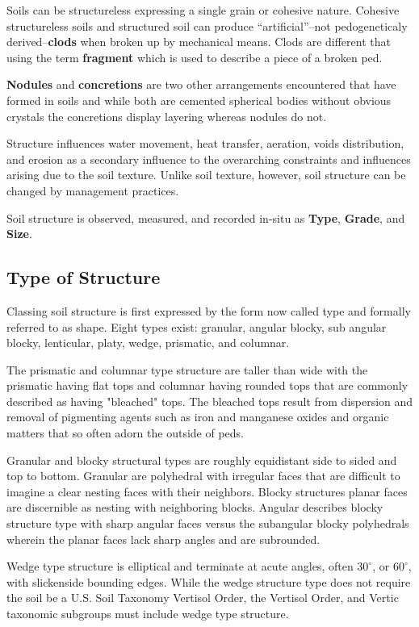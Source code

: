 \documentclass[a5paper]{report}
\begin{document}
Soils can be structureless expressing a single grain or cohesive nature. Cohesive structureless soils and structured soil can produce “artificial”–not pedogeneticaly derived–\textbf{clods} when broken up by mechanical means. Clods are different that using the term \textbf{fragment} which is used to describe a piece of a broken ped.
    
\textbf{Nodules} and \textbf{concretions} are two other arrangements encountered that have formed in soils and while both are cemented spherical bodies without obvious crystals the concretions display layering whereas nodules do not.
    
Structure influences water movement, heat transfer, aeration, voids distribution, and erosion as a secondary influence to the overarching constraints and influences arising due to the soil texture. Unlike soil texture, however, soil structure can be changed by management practices.
    
Soil structure is observed, measured, and recorded in-situ as \textbf{Type}, \textbf{Grade}, and \textbf{Size}.
    
\subsection{Type of Structure}
    
Classing soil structure is first expressed by the form now called type and formally referred to as shape. Eight types exist: granular, angular blocky, sub angular blocky, lenticular, platy, wedge, prismatic, and columnar.

The prismatic and columnar type structure are taller than wide with the prismatic having flat tops and columnar having rounded tops that are commonly described as having "bleached" tops. The bleached tops result from dispersion and removal of pigmenting agents such as iron and manganese oxides and organic matters that so often adorn the outside of peds.

Granular and blocky structural types are roughly equidistant side to sided and top to bottom. Granular are polyhedral with irregular faces that are difficult to imagine a clear nesting faces with their neighbors. Blocky structures planar faces are discernible as nesting with neighboring blocks. Angular describes blocky structure type with sharp angular faces versus the subangular blocky polyhedrals wherein the planar faces lack sharp angles and are subrounded.

Wedge type structure is elliptical and terminate at acute angles, often $30^{\circ}$, or $60^{\circ}$, with slickenside bounding edges. While the wedge structure type does not require the soil be a U.S. Soil Taxonomy Vertisol Order, the Vertisol Order, and Vertic taxonomic subgroups must include wedge type structure.
\end{document}
